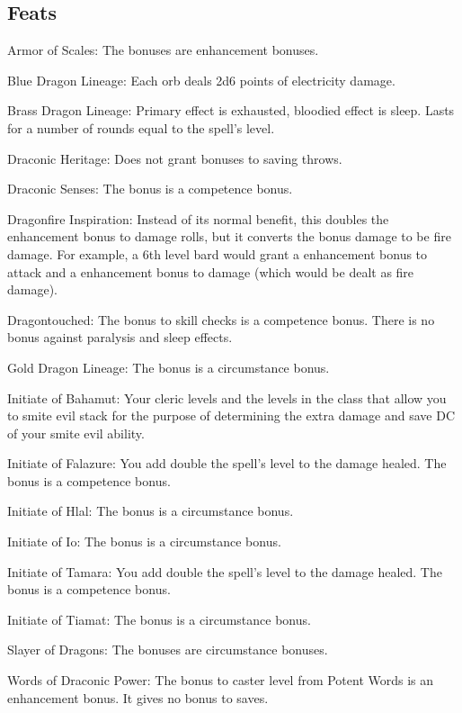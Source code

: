 \subsection{Feats}
\begin{itemize*}
\item Armor of Scales: The bonuses are enhancement bonuses.
\item Blue Dragon Lineage: Each orb deals 2d6 points of electricity damage.
\item Brass Dragon Lineage: Primary effect is exhausted, bloodied effect is sleep. Lasts for a number of rounds equal to the spell's level.
\item Draconic Heritage: Does not grant bonuses to saving throws.
\item Draconic Senses: The bonus is a competence bonus.
\item Dragonfire Inspiration: Instead of its normal benefit, this doubles the enhancement bonus to damage rolls, but it converts the bonus damage to be fire damage. For example, a 6th level bard would grant a  enhancement bonus to attack and a  enhancement bonus to damage (which would be dealt as fire damage). 
\item Dragontouched: The bonus to skill checks is a competence bonus. There is no bonus against paralysis and sleep effects.
\item Gold Dragon Lineage: The bonus is a circumstance bonus.
\item Initiate of Bahamut: Your cleric levels and the levels in the class that allow you to smite evil stack for the purpose of determining the extra damage and save DC of your smite evil ability.
\item Initiate of Falazure: You add double the spell's level to the damage healed. The bonus is a competence bonus.
\item Initiate of Hlal: The bonus is a circumstance bonus.
\item Initiate of Io: The bonus is a circumstance bonus.
\item Initiate of Tamara: You add double the spell's level to the damage healed. The bonus is a competence bonus.
\item Initiate of Tiamat: The bonus is a circumstance bonus.
\item Slayer of Dragons: The bonuses are circumstance bonuses.
\item Words of Draconic Power: The bonus to caster level from Potent Words is an enhancement bonus. It gives no bonus to saves.
\end{itemize*}

